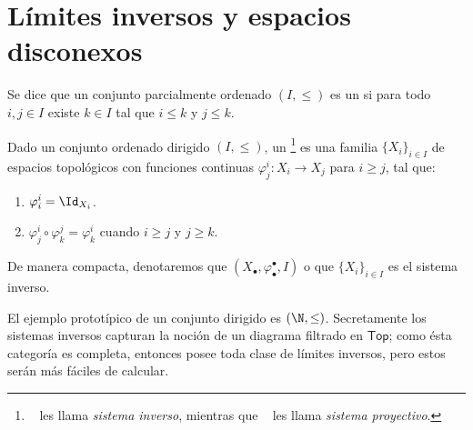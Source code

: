 \documentclass[topologia-analisis.tex]{subfiles}
\begin{document}


\section{Límites inversos y espacios disconexos}
\begin{mydef}
	Se dice que un conjunto parcialmente ordenado $(I, \le)$ es un  si para todo $i, j \in I$
	existe $k \in I$ tal que $i \le k$ y $j \le k$.

	Dado un conjunto ordenado dirigido $(I, \le)$, un %
	\footnote{\citeauthor{engelking:top}~\cite{engelking:top} les llama \textit{sistema inverso}, mientras que
	\citeauthor{bourbaki:TG1}~\cite[I.28]{bourbaki:TG1} les llama \textit{sistema proyectivo}.}
	es una familia $\{ X_i \}_{i\in I}$ de espacios topológicos con funciones continuas $\varphi^i_j \colon X_i \to X_j$ para $i \ge j$, tal que:
	\begin{enumerate}
		\item $\varphi^i_i = \Id_{X_i}$.
		\item $\varphi^i_j \circ \varphi^j_k = \varphi^i_k$ cuando $i \ge j$ y $j \ge k$.
	\end{enumerate}
	De manera compacta, denotaremos que $(X_\bullet, \varphi^\bullet_\bullet, I)$ o que $\{ X_i \}_{i\in I}$ es el sistema inverso.
\end{mydef}
El ejemplo prototípico de un conjunto dirigido es $(\N, \le)$.
Secretamente los sistemas inversos capturan la noción de un diagrama filtrado en $\mathsf{Top}$;
como ésta categoría es completa, entonces posee toda clase de límites inversos, pero estos serán más fáciles de calcular.
\end{document}
